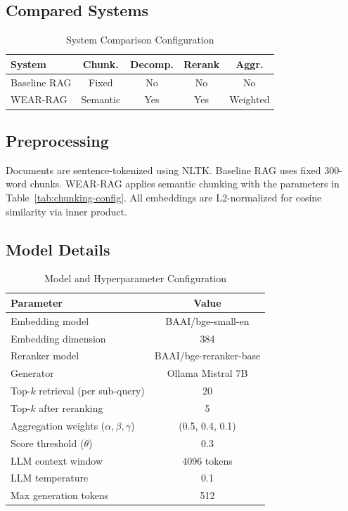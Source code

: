 \documentclass[conference]{IEEEtran}
\begin{document}
\subsection{Compared Systems}
\begin{table}[!ht]
\centering
\caption{System Comparison Configuration}
\label{tab:systems}
\footnotesize
\begin{tabular}{lcccc}
\toprule
\textbf{System} & \textbf{Chunk.} & \textbf{Decomp.} & \textbf{Rerank} & \textbf{Aggr.} \\
\midrule
Baseline RAG & Fixed & No & No & No \\
WEAR-RAG & Semantic & Yes & Yes & Weighted \\
\bottomrule
\end{tabular}
\end{table}

\subsection{Preprocessing}
Documents are sentence-tokenized using NLTK. Baseline RAG uses fixed 300-word chunks. WEAR-RAG applies semantic chunking with the parameters in Table~\ref{tab:chunking-config}. All embeddings are L2-normalized for cosine similarity via inner product.

\subsection{Model Details}
\begin{table}[!ht]
\centering
\caption{Model and Hyperparameter Configuration}
\label{tab:hyperparams}
\begin{tabular}{lc}
\toprule
\textbf{Parameter} & \textbf{Value} \\
\midrule
Embedding model & BAAI/bge-small-en \\
Embedding dimension & 384 \\
Reranker model & BAAI/bge-reranker-base \\
Generator & Ollama Mistral 7B \\
Top-$k$ retrieval (per sub-query) & 20 \\
Top-$k$ after reranking & 5 \\
Aggregation weights ($\alpha, \beta, \gamma$) & (0.5, 0.4, 0.1) \\
Score threshold ($\theta$) & 0.3 \\
LLM context window & 4096 tokens \\
LLM temperature & 0.1 \\
Max generation tokens & 512 \\
\bottomrule
\end{tabular}
\end{table}
\end{document}

